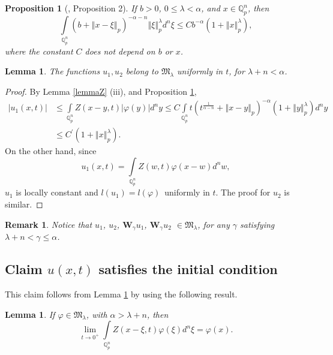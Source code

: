 \documentclass{amsart}\usepackage{amsfonts}
\theoremstyle{plain}
\newtheorem{lemma}[theorem]{Lemma}
\newtheorem{proposition}[theorem]{Proposition}
\newtheorem{remark}[theorem]{Remark}
\numberwithin{equation}{section}
\begin{document}
\begin{proposition}
[\cite{R-Zu}, Proposition 2]\label{Conv} If $b>0$, $0\leq\lambda<\alpha$, and
$x\in\mathbb{Q}_{p}^{n}$, then\[
\underset{\mathbb{Q}_{p}^{n}}{\int}\left(  b+\left\Vert x-\xi\right\Vert
_{p}\right)  ^{-\alpha-n}\left\Vert \xi\right\Vert _{p}^{\lambda}d^{n}\xi\leq
Cb^{-\alpha}\left(  1+\left\Vert x\right\Vert _{p}^{\lambda}\right)  ,
\]
where the constant $C$ does not depend on $b$ or $x$.
\end{proposition}

\begin{lemma}
\label{u1u2}The functions $u_{1},u_{2}$ belong to $\mathcal{\mathfrak{M}}_{\lambda}$ uniformly in $t$, for $\lambda+n<\alpha$.
\end{lemma}

\begin{proof}
By Lemma \ref{lemmaZ} (iii), and Proposition \ref{Conv},\begin{align*}
\left\vert u_{1}(x,t)\right\vert  &  \leq\underset{\mathbb{Q}_{p}^{n}}{\int
}Z(x-y,t)\left\vert \varphi(y)\right\vert d^{n}y\leq C\underset{\mathbb{Q}_{p}^{n}}{\int}t\left(  t^{\frac{1}{\alpha-n}}+\left\Vert x-y\right\Vert
_{p}\right)  ^{-\alpha}\left(  1+\left\Vert y\right\Vert _{p}^{\lambda
}\right)  d^{n}y\\
&  \leq C^{\prime}\left(  1+\left\Vert x\right\Vert _{p}^{\lambda}\right)  .
\end{align*}
On the other hand, since\[
u_{1}(x,t)=\underset{\mathbb{Q}_{p}^{n}}{\int}Z(w,t)\varphi(x-w)d^{n}w,
\]
$u_{1}$ is locally constant and $l\left(  u_{1}\right)  =l\left(
\varphi\right)  $\ uniformly in $t$. The proof for $u_{2}$ is similar.
\end{proof}

\begin{remark}
\label{nota2}Notice that $u_{1}$, $u_{2}$, $\boldsymbol{W}_{\gamma}u_{1}$,
$\boldsymbol{W}_{\gamma}u_{2}$ $\in\mathcal{\mathfrak{M}}_{\lambda}$, for any
$\gamma$ satisfying $\lambda+n<\gamma\leq\alpha$.
\end{remark}

\subsection{\textbf{Claim} $u(x,t)$ satisfies the initial condition}

This claim follows from Le\-mma \ref{u1u2} by using the following result.

\begin{lemma}
\label{CI}If $\varphi\in\mathcal{\mathfrak{M}}_{\lambda}$, with $\alpha
>\lambda+n$, then\[
\underset{t\rightarrow0^{+}}{\lim}\underset{\mathbb{Q}_{p}^{n}}{\int}Z(x-\xi,t)\varphi(\xi)d^{n}\xi=\varphi(x).
\]

\end{lemma}
\end{document}
